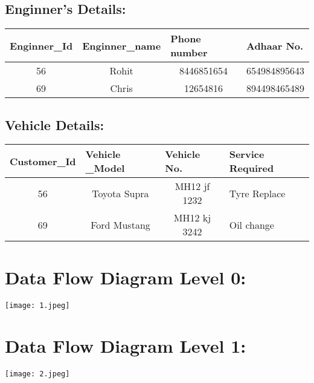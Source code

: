 \documentclass[16pt]{article}
\begin{document}
\subsection{\textbf{Enginner's Details:}}
\begin{table}[H]
	\begin{tabular}{|c|c|c|l|}
	\hline
	\multicolumn{1}{|l|}{Enginner\_Id} & \multicolumn{1}{l|}{Enginner\_name} & \multicolumn{1}{l|}{Phone number} & Adhaar No.   \\ \hline
	56                                 & Rohit                               & 8446851654                        & 654984895643 \\ \hline
	69                                 & Chris                               & 12654816                          & 894498465489 \\ \hline
	\end{tabular}
	\end{table}

\subsection{\textbf{Vehicle Details:}}
\begin{table}[H]
	\begin{tabular}{|c|c|c|l|}
	\hline
	\multicolumn{1}{|l|}{Customer\_Id} & \multicolumn{1}{l|}{Vehicle \_Model} & \multicolumn{1}{l|}{Vehicle No.} & Service Required \\ \hline
	56                                 & Toyota Supra                         & MH12 jf 1232                     & Tyre Replace     \\ \hline
	69                                 & Ford Mustang                         & MH12 kj 3242                     & Oil change       \\ \hline
	\end{tabular}
	\end{table}
	
\section{\textbf{Data Flow Diagram Level 0:}}
\begin{center}
    \texttt{[image: 1.jpeg]}
\end{center}

\section{\textbf{Data Flow Diagram Level 1:}}
\begin{center}
    \texttt{[image: 2.jpeg]}
\end{center}
\end{document}
